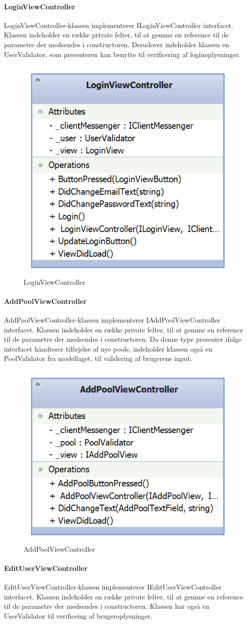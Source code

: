 \paragraph{LoginViewController}
LoginViewController-klassen implementerer ILoginViewController interfacet. Klassen indeholder en række private felter, til at gemme en reference til de parametre der medsendes i constructoren. Derudover indeholder klassen en UserValidator, som presenteren kan benytte til verificering af loginoplysninger.

\begin{figure}
	\centering
	\includegraphics[width=0.3\linewidth]{figs/design/application_loginviewcontroller}
	\caption{LoginViewController}
	\label{fig:application_loginviewcontroller}
\end{figure}

\paragraph{AddPoolViewController}
AddPoolViewController-klassen implementerer IAddPoolViewController interfacet. Klassen indeholder en række private felter, til at gemme en reference til de parametre der medsendes i constructoren. Da denne type presenter ifølge interfacet håndterer tilføjelse af nye pools, indeholder klassen også en PoolValidator fra modellaget, til validering af brugerens input.

\begin{figure}
	\centering
	\includegraphics[width=0.3\linewidth]{figs/design/application_addpoolviewcontroller}
	\caption{AddPoolViewController}
	\label{fig:application_addpoolviewcontroller}
\end{figure}

\paragraph{EditUserViewController}
EditUserViewController-klassen implementerer IEditUserViewController interfacet. Klassen indeholder en række private felter, til at gemme en reference til de parametre der medsendes i constructoren. Klassen har også en UserValidator til verificeing af brugeroplysninger.

